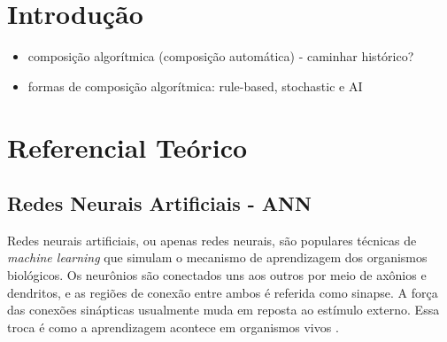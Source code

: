 \documentclass{automatextcc}
\begin{document}
\listoftables




\chapter{Introdução}

\begin{itemize}
    \item composição algorítmica (composição automática) - caminhar histórico?
    \item formas de composição algorítmica: rule-based, stochastic e AI
\end{itemize}





\chapter{Referencial Teórico}

\section{Redes Neurais Artificiais - ANN}

Redes neurais artificiais, ou apenas redes neurais, são populares técnicas de \textit{machine learning} que simulam o mecanismo de aprendizagem dos organismos biológicos. Os neurônios são conectados uns aos outros por meio de axônios e dendritos, e as regiões de conexão entre ambos é referida como sinapse. A força das conexões sinápticas usualmente muda em reposta ao estímulo externo. Essa troca é como a aprendizagem acontece em organismos vivos \citep{aggarwal2018DeepLearning}. 
\end{document}
